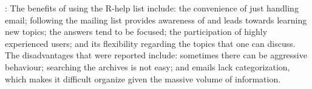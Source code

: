 \noindent\textbf{\RH}:
The benefits of using the R-help list include: the convenience of just handling email; following the mailing list provides awareness of and leads towards
learning new topics; the answers tend to be focused; the participation of highly experienced
users; and its flexibility regarding the topics that one can discuss.  The disadvantages that were reported include: sometimes there can be aggressive
behaviour; searching the archives is not easy; and emails lack categorization, which makes it difficult organize given the massive volume of information.

